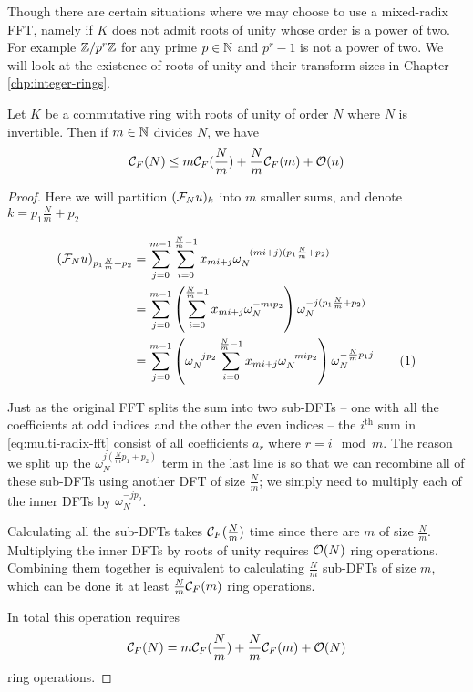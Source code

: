 Though there are certain situations where we may choose to use a mixed-radix FFT, namely if $K$ does not admit roots of unity whose order is a power of two. For example ${\mathbb Z}/p^r{\mathbb Z}$ for any prime $p \in {\mathbb N}$ and $p^r - 1$ is not a power of two. We will look at the existence of roots of unity and their transform sizes in Chapter \ref{chp:integer-rings}.

\begin{theorem}\label{thm:mixed-radix-fft}
    Let $K$ be a commutative ring with roots of unity of order $N$ where $N$ is invertible. Then if $m \in {\mathbb N}$ divides $N$, we have
    \[
        \mathcal C_F(N) \le m\mathcal C_F(\frac{N}{m}) + \frac{N}{m}\mathcal C_F(m) + \mathcal O(n)
    \]
\end{theorem}

\begin{proof}
    Here we will partition $(\mathcal F_N u)_k$ into $m$ smaller sums, and denote $k = p_1 \frac{N}{m} + p_2$

    \begin{align*}
        (\M{F}_N u)_{p_1\frac{N}{m} + p_2}
        &= \sum^{m-1}_{j=0} \sum^{\frac{N}{m}-1}_{i=0} x_{mi + j}\omega_N^{-(mi + j)(p_1 \frac{N}{m} + p_2)}\\
        &= \sum^{m-1}_{j=0} \bb{\sum^{\frac{N}{m}-1}_{i=0} x_{mi + j}\omega_N^{-mi p_2}} \omega_N^{-j(p_1\frac{N}{m} + p_2)}\\
        &= \sum^{m-1}_{j=0} \bb{\omega_N^{-jp_2}\sum^{\frac{N}{m}-1}_{i=0} x_{mi + j}\omega_N^{-mi p_2}} \omega_N^{-\frac{N}{m}p_1 j} \stepcounter{equation}\tag{\theequation} \label{eq:multi-radix-fft}
    \end{align*}

    Just as the original FFT splits the sum into two sub-DFTs -- one with all the coefficients at odd indices and the other the even indices -- the $i^{\text{th}}$ sum in \eqref{eq:multi-radix-fft} consist of all coefficients $a_r$ where $r = i \mod m$. The reason we split up the $\omega_N^{j(\frac{N}{m}p_1 + p_2)}$ term in the last line is so that we can recombine all of these sub-DFTs using another DFT of size $\frac{N}{m}$; we simply need to multiply each of the inner DFTs by $\omega_N^{-jp_2}$.

    Calculating all the sub-DFTs takes $\mathcal C_F(\frac{N}{m})$ time since there are $m$ of size $\frac{N}{m}$. Multiplying the inner DFTs by roots of unity requires $\mathcal O(N)$ ring operations. Combining them together is equivalent to calculating $\frac{N}{m}$ sub-DFTs of size $m$, which can be done it at least $\frac{N}{m}\mathcal C_F(m)$ ring operations.

    In total this operation requires
    \[
        \mathcal C_F(N) = m\mathcal C_F(\frac{N}{m}) + \frac{N}{m}\mathcal C_F(m) + \mathcal O(N)
    \]
    ring operations.
\end{proof}

